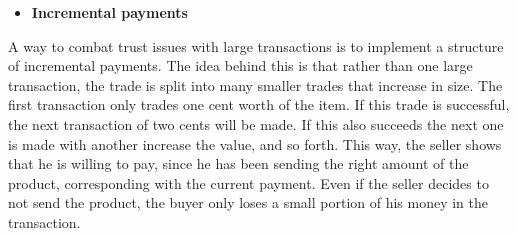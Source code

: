 \begin{itemize}
\item \textbf{Incremental payments}
\end{itemize}
A way to combat trust issues with large transactions is to implement a structure of incremental payments.
The idea behind this is that rather than one large transaction, the trade is split into many smaller trades that increase in size.
The first transaction only trades one cent worth of the item. If this trade is successful, the next transaction of two cents will be made. If this also succeeds the next one is made with another increase the value, and so forth.
This way, the seller shows that he is willing to pay, since he has been sending the right amount of the product, corresponding with the current payment.
Even if the seller decides to not send the product, the buyer only loses a small portion of his money in the transaction.

